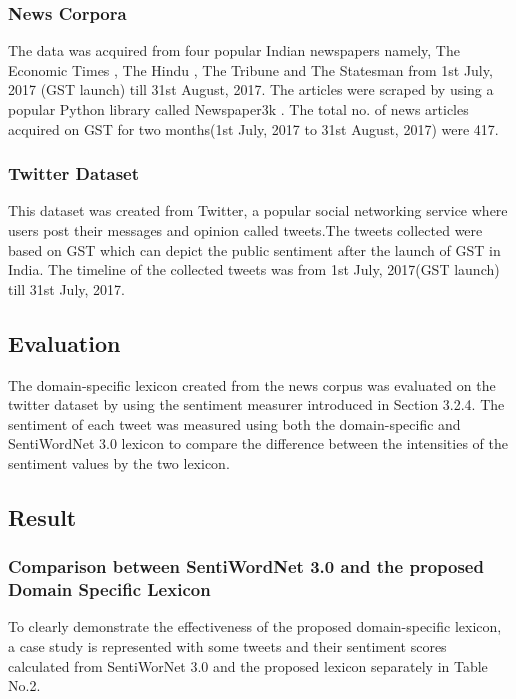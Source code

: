 \documentclass[a4paper, 10pt, conference]{ieeeconf}
\begin{document}
\subsubsection{News Corpora}

The data was acquired from four popular Indian newspapers namely, The Economic Times \cite{c8}, The Hindu \cite{c9}, The Tribune \cite{c10} and The Statesman \cite{c11} from  1st July, 2017 (GST launch) till 31st August, 2017. The articles were scraped by using a popular Python library called Newspaper3k \cite{c7}. The total no. of news articles acquired on GST for two months(1st July, 2017 to 31st August, 2017) were 417.

\subsubsection{Twitter Dataset}
This dataset was created from Twitter, a popular social networking service where users post their messages and opinion called tweets.The tweets collected were based on GST which can depict the public sentiment after the launch of GST in India. The timeline of the collected tweets was from 1st July, 2017(GST launch) till 31st July, 2017.
\subsection{Evaluation}
The domain-specific lexicon created from the news corpus was evaluated on the twitter dataset by using the sentiment measurer introduced in Section 3.2.4. The sentiment of each tweet was measured using both the domain-specific and SentiWordNet 3.0 lexicon to compare the difference between the intensities of the sentiment values by the two lexicon.

\subsection{Result}
\subsubsection{Comparison between SentiWordNet 3.0 and the proposed Domain Specific Lexicon}

To clearly demonstrate the effectiveness of the proposed domain-specific lexicon, a case study is represented with some tweets and their sentiment scores calculated from SentiWorNet 3.0 and the proposed lexicon separately in Table No.2.
\end{document}

